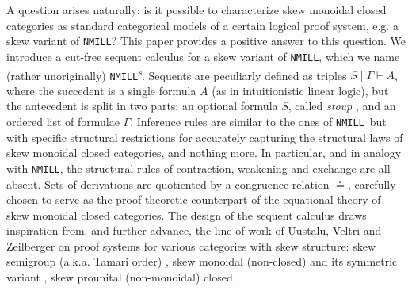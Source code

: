 \documentclass[submission,copyright,creativecommons]{eptcs}
\theoremstyle{definition}
\newcommand{\NMILL}{\texttt{NMILL}}
\newcommand{\SkNMILL}{\NMILL\textsuperscript{\textit{s}}}
\begin{document}
A question arises naturally: is it possible to characterize skew monoidal closed categories as standard categorical models of a certain logical proof system, e.g. a skew variant of \NMILL?
This paper provides a positive answer to this question. We introduce a cut-free sequent calculus for a skew variant of \NMILL, which we name (rather unoriginally) \SkNMILL. Sequents are peculiarly defined as triples $S \mid \Gamma \vdash A$, where the succedent is a single formula $A$ (as in intuitionistic linear logic), but the antecedent is split in two parts: an optional formula $S$, called \emph{stoup} \cite{girard:constructive:91}, and an ordered list of formulae $\Gamma$. Inference rules are similar to the ones of \NMILL\ but with specific structural restrictions for accurately capturing the structural laws of skew monoidal closed categories, and nothing more. In particular, and in analogy with \NMILL, the structural rules of contraction, weakening and exchange are all absent. Sets of derivations are quotiented by a congruence relation $\circeq$, carefully chosen to serve as the proof-theoretic counterpart of the equational theory of skew monoidal closed categories. The design of the sequent calculus draws inspiration from, and further advance, the line of work of Uustalu, Veltri and Zeilberger on proof systems for various categories with skew structure: skew semigroup (a.k.a. Tamari order) \cite{zeilberger:semiassociative:19}, skew monoidal (non-closed) \cite{uustalu:sequent:2021,uustalu:proof:nodate} and its symmetric variant \cite{veltri:coherence:2021}, skew prounital (non-monoidal) closed \cite{uustalu:deductive:nodate}.
\end{document}
